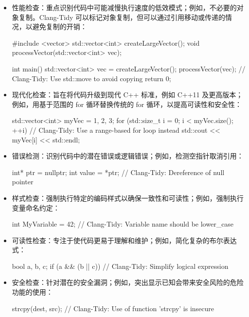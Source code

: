 \begin{itemize}
\item
性能检查：重点识别代码中可能减慢执行速度的低效模式；例如，不必要的对象复制。Clang-Tidy 可以标记对象复制，但可以通过引用移动或传递的情况，以避免复制的开销：

\begin{cpp}
#include <vector>
std::vector<int> createLargeVector();
void processVector(std::vector<int> vec);

int main() {
    std::vector<int> vec = createLargeVector();
    processVector(vec); // Clang-Tidy: Use std::move to avoid copying
    return 0;
}
\end{cpp}

\item
现代化检查：旨在将代码升级到现代 C++ 标准，例如 C++11 及更高版本；例如，用基于范围的 for 循环替换传统的 for 循环，以提高可读性和安全性：

\begin{cpp}
std::vector<int> myVec = {1, 2, 3};
for (std::size_t i = 0; i < myVec.size(); ++i) {
    // Clang-Tidy: Use a range-based for loop instead
    std::cout << myVec[i] << std::endl;
}
\end{cpp}

\item
错误检测：识别代码中的潜在错误或逻辑错误；例如，检测空指针取消引用：

\begin{cpp}
int* ptr = nullptr;
int value = *ptr; // Clang-Tidy: Dereference of null pointer
\end{cpp}

\item
样式检查：强制执行特定的编码样式以确保一致性和可读性；例如，强制执行变量命名约定：

\begin{cpp}
int MyVariable = 42; // Clang-Tidy: Variable name should be lower_case
\end{cpp}

\item
可读性检查：专注于使代码更易于理解和维护；例如，简化复杂的布尔表达式：

\begin{cpp}
bool a, b, c;
if (a && (b || c)) {
    // Clang-Tidy: Simplify logical expression
}
\end{cpp}

\item
安全检查：针对潜在的安全漏洞；例如，突出显示已知会带来安全风险的危险功能的使用：

\begin{cpp}
strcpy(dest, src); // Clang-Tidy: Use of function 'strcpy' is insecure
\end{cpp}

\end{itemize}

